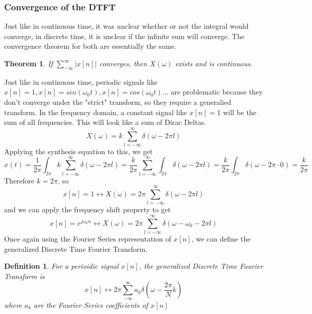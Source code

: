 \documentclass{article}
\newtheorem{theorem}{Theorem}
\newtheorem{definition}{Definition}
\begin{document}
\subsubsection{Convergence of the DTFT}
Just like in continuous time, it was unclear whether or not the integral would converge,
in discrete time, it is unclear if the infinite sum will converge. The convergence theorem for both are essentially the same.
\begin{theorem}
    If $\sum_{-\infty}^{\infty}{|x[n]|}$ converges, then $X(\omega)$ exists and is continuous.
\end{theorem}
Just like in continuous time, periodic signals like $x[n] = 1, x[n] = sin(\omega_0t), x[n]=cos(\omega_0t)...$
are problematic because they don't converge under the "strict" transform, so they require a generalied transform.
In the frequency domain, a constant signal like $x[n] = 1$ will be the sum of all frequencies. This will look like
a sum of Dirac Deltas.
$$X(\omega) = k \sum_{l=-\infty}^{\infty}{\delta(\omega - 2\pi l)}$$
Applying the synthesis equation to this, we get
$$x(t) = \frac{1}{2\pi}\int_{2\pi}{k \sum_{l=-\infty}^{\infty}{\delta(\omega - 2\pi l)}} = \frac{k}{2\pi}\sum_{l=-\infty}^{\infty}{\int_{2\pi}{\delta(\omega - 2\pi l)}} = \frac{k}{2\pi}\int_{2\pi}{\delta(\omega - 2\pi \cdot 0)} = \frac{k}{2\pi}$$
Therefore $k = 2\pi$, so
$$x[n] = 1 \leftrightarrow X(\omega) = 2\pi\sum_{l=-\infty}^{\infty}{\delta(\omega - 2\pi l)}$$
and we can apply the frequency shift property to get
$$x[n] = e^{j\omega_0n} \leftrightarrow X(\omega) = 2\pi\sum_{l=-\infty}^{\infty}{\delta(\omega - \omega_0 - 2\pi l)}$$
Once again using the Fourier Series representation of $x[n]$, we can define the generalized Discrete Time Fourier Transform.
\begin{definition}
    For a perioidic signal $x[n]$, the generalized Discrete Time Fourier Transform is
    $$x[n] \leftrightarrow 2\pi\sum_{-\infty}^{\infty}{a_k\delta(\omega-\frac{2\pi}{N}k)}$$
    where $a_k$ are the Fourier Series coefficients of $x[n]$
\end{definition}
\end{document}
